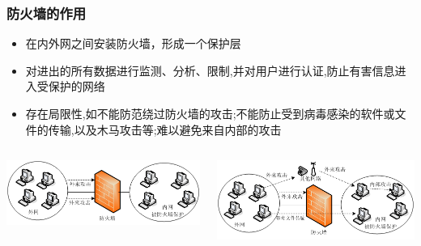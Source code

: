 \documentclass[xcolor=svgnames,presentation]{beamer}
\begin{document}
\begin{frame}
\frametitle{防火墙的作用}
\label{sec-1-2}
\begin{itemize}

\item 在内外网之间安装防火墙，形成一个保护层
\label{sec-1-2-1}%

\item 对进出的所有数据进行监测、分析、限制,并对用户进行认证,防止有害信息进入受保护的网络
\label{sec-1-2-2}%

\item 存在局限性,如不能防范绕过防火墙的攻击;不能防止受到病毒感染的软件或文件的传输,以及木马攻击等;难以避免来自内部的攻击
\label{sec-1-2-3}%
\end{itemize} %
\begin{columns}
\begin{column}{0.5\textwidth}
\label{sec-1-2-4}

\includegraphics[width=.9\linewidth]{img/firewall1.png}
\end{column}
\begin{column}{0.5\textwidth}
\label{sec-1-2-5}

\includegraphics[width=.9\linewidth]{img/firewall2.png}
\end{column}
\end{columns}
\end{frame}
\end{document}
